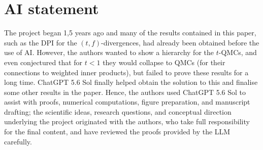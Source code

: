 \documentclass[11pt]{article}
\theoremstyle{remark}
\newcommand{\1}{\mathbbm{1}}
\begin{document}
\section*{AI statement}

The project began 1,5 years ago and many of the results contained in this paper, such as the DPI for the $(t,f)$-divergences, had already been obtained before the use of AI. However, the authors wanted to show a hierarchy for the $t$-QMCs, and even conjectured that for $t<1$ they would collapse to QMCs (for their connections to weighted inner products), but failed to prove these results for a long time. ChatGPT 5.6 Sol finally helped obtain the solution to this and finalise some other results in the paper. Hence, the authors used ChatGPT 5.6 Sol to assist with proofs, numerical computations, figure preparation, and manuscript drafting; the scientific ideas, research questions, and conceptual direction underlying the project originated with the authors, who take full responsibility for the final content, and have reviewed the proofs provided by the LLM carefully.





\end{document}
